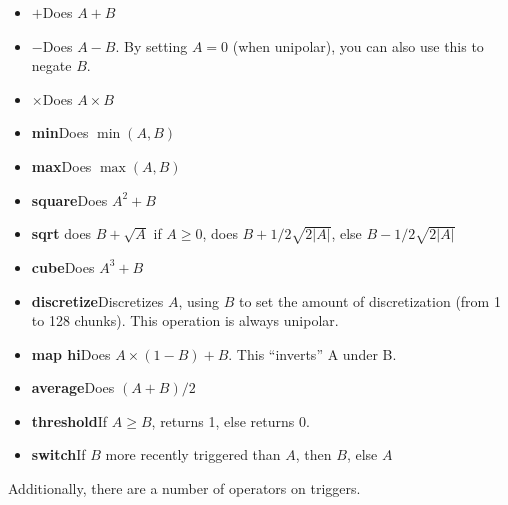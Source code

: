 \documentclass{article}
\begin{document}
\begin{itemize}
\item \(\boldsymbol{+}\)\quad Does \(A + B\)
\item \(\boldsymbol -\)\quad Does \(A - B\).  By setting \(A=0\) (when unipolar), you can also use this to negate \(B\).
\item \(\boldsymbol \times\)\quad Does \(A \times B\)
\item {\bf min}\quad Does \(\min(A, B)\)
\item {\bf max}\quad Does \(\max(A, B)\)
\item {\bf square}\quad Does \(A^2 + B\)
\item {\bf sqrt} does \(B + \sqrt{A}\) if \(A \geq 0\), does \(B + 1/2 \sqrt{2 |A|}\), else \(B - 1/2 \sqrt{2 |A|}\)
\item {\bf cube}\quad Does \(A^3 + B\)
\item {\bf discretize}\quad Discretizes \(A\), using \(B\) to set the amount of discretization (from 1 to 128 chunks).  This operation is always unipolar.
\item {\bf map hi}\quad Does \(A \times (1-B) + B\).  This ``inverts'' A under B.
\item {\bf average}\quad Does \((A + B) / 2\)
\item {\bf threshold}\quad If \(A \geq B\), returns 1, else returns 0.
\item {\bf switch}\quad If \(B\) more recently triggered than \(A\), then \(B\), else \(A\)
\end{itemize}

\noindent Additionally, there are a number of operators on triggers.
\end{document}
